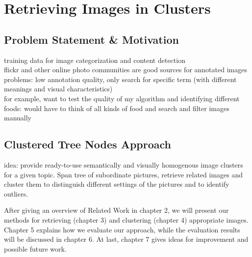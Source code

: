 \section{Retrieving Images in Clusters}
\label{sec_introduction}


\subsection{Problem Statement \& Motivation}
training data for image categorization and content detection \\
flickr and other online photo communities are good sources for annotated images \\
problems: low annotation quality, only search for specific term (with different meanings and visual characteristics) \\
for example, want to test the quality of my algorithm and identifying different foods: would have to think of all kinds of food and search and filter images manually

\subsection{Clustered Tree Nodes Approach}
idea: provide ready-to-use semantically and visually homogenous image clusters for a given topic. Span tree of subordinate pictures, retrieve related images and cluster them to distinguish different settings of the pictures and to identify outliers.

\bigskip

After giving an overview of Related Work in chapter 2, we will present our methods for retrieving (chapter 3) and clustering (chapter 4) appropriate images. Chapter 5 explains how we evaluate our approach, while the evaluation results will be discussed in chapter 6. At last, chapter 7 gives ideas for improvement and possible future work.